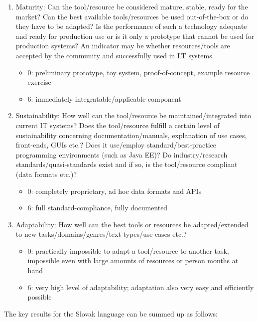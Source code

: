 \begin{multicols}{2}
\begin{enumerate}
\item Maturity: Can the tool/resource be considered mature, stable, ready for the market? Can the best available tools/resources be used out-of-the-box or do they have to be adapted? Is the performance of such a technology adequate and ready for production use or is it only a prototype that cannot be used for production systems? An indicator may be whether resources/tools are accepted by the community and successfully used in LT systems. 
\begin{itemize}
\item 0: preliminary prototype, toy system, proof-of-concept, example resource exercise
\item 6: immediately integratable/applicable component
\end{itemize}
\item Sustainability: How well can the tool/resource be maintained/integrated into current IT systems? Does the tool/resource fulfill a certain level of sustainability concerning documentation/manuals, explanation of use cases, front-ends, GUIs etc.? Does it use/employ standard/best-practice programming environments (such as Java EE)? Do industry/research standards/quasi-standards exist and if so, is the tool/resource compliant (data formats etc.)?
\begin{itemize}
\item 0: completely proprietary, ad hoc data formats and APIs
\item 6: full standard-compliance, fully documented
\end{itemize}
\item Adaptability: How well can the best tools or resources be adapted/extended to new tasks/domains/genres/text types/use cases etc.?
\begin{itemize}
\item 0: practically impossible to adapt a tool/resource to another task, impossible even with large amounts of resources or person months at hand
\item 6: very high level of adaptability; adaptation also very easy and efficiently possible
\end{itemize}
\end{enumerate}

The key results for the Slovak language can be summed up as follows:


\end{multicols}
